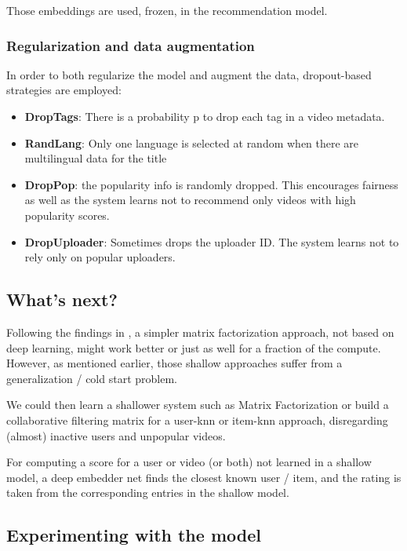 Those embeddings are used, frozen, in the recommendation model.

\subsubsection{Regularization and data augmentation}

In order to both regularize the model and augment the data, dropout-based strategies are employed:

\begin{itemize}
    \item \textbf{DropTags}: There is a probability p to drop each tag in a video metadata.
    \item \textbf{RandLang}: Only one language is selected at random when there are multilingual data for the title
    \item \textbf{DropPop}: the popularity info is randomly dropped. This encourages fairness as well as the system learns not to recommend only videos with high popularity scores.
    \item \textbf{DropUploader}: Sometimes drops the uploader ID. The system learns not to rely only on popular uploaders.
\end{itemize}


\subsection{What's next?}

Following the findings in \citet{dlinrec}, a simpler matrix factorization approach, not based on deep learning, might work better or just as well for a fraction of the compute. However, as mentioned earlier, those shallow approaches suffer from a generalization / cold start problem.

We could then learn a shallower system such as Matrix Factorization or build a collaborative filtering matrix for a user-knn or item-knn approach, disregarding (almost) inactive users and unpopular videos. 

For computing a score for a user or video (or both) not learned in a shallow model, a deep embedder net finds the closest known user / item, and the rating is taken from the corresponding entries in the shallow model.

\subsection{Experimenting with the model}

